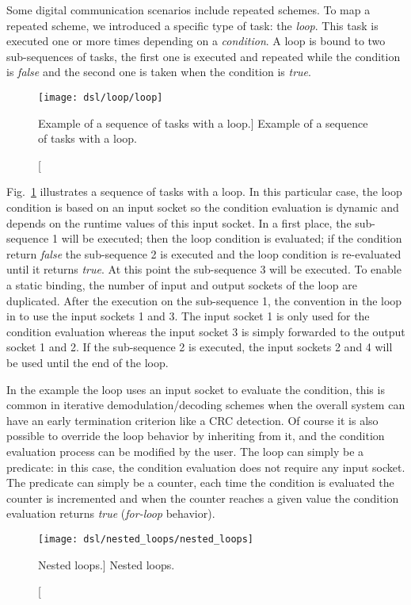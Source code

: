 Some digital communication scenarios include repeated schemes. To map a repeated
scheme, we introduced a specific type of task: the \emph{loop}. This task is
executed one or more times depending on a \emph{condition}. A loop is bound to
two sub-sequences of tasks, the first one is executed and repeated while the
condition is \emph{false} and the second one is taken when the condition is
\emph{true}.

\begin{figure}[htp]
  \centering
  \texttt{[image: dsl/loop/loop]}
  \caption
    [Example of a sequence of tasks with a loop.]
    {Example of a sequence of tasks with a loop.}
  \label{fig:dsl_loop}
\end{figure}

Fig.~\ref{fig:dsl_loop} illustrates a sequence of tasks with a loop. In this
particular case, the loop condition is based on an input socket so the condition
evaluation is dynamic and depends on the runtime values of this input socket.
In a first place, the sub-sequence 1 will be executed; then the loop condition
is evaluated; if the condition return \emph{false} the sub-sequence 2 is
executed and the loop condition is re-evaluated until it returns \emph{true}. At
this point the sub-sequence 3 will be executed. To enable a static binding, the
number of input and output sockets of the loop are duplicated. After the
execution on the sub-sequence 1, the convention in the loop in to use the input
sockets 1 and 3. The input socket 1 is only used for the condition evaluation
whereas the input socket 3 is simply forwarded to the output socket 1 and 2. If
the sub-sequence 2 is executed, the input sockets 2 and 4 will be used until the
end of the loop.

In the example the loop uses an input socket to evaluate the condition, this is
common in iterative demodulation/decoding schemes when the overall system can
have an early termination criterion like a CRC detection. Of course it is also
possible to override the loop behavior by inheriting from it, and the condition
evaluation process can be modified by the user. The loop can simply be a
predicate: in this case, the condition evaluation does not require any input
socket. The predicate can simply be a counter, each time the condition is
evaluated the counter is incremented and when the counter reaches a given value
the condition evaluation returns \emph{true} (\emph{for-loop} behavior).

\begin{figure}[htp]
  \centering
  \texttt{[image: dsl/nested\_loops/nested\_loops]}
  \caption
    [Nested loops.]
    {Nested loops.}
  \label{fig:dsl_nested_loops}
\end{figure}

